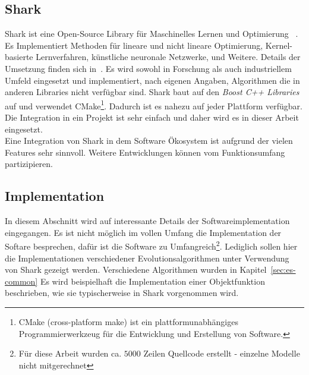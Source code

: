 %
\lstset{
	basicstyle=\scriptsize,
	language=C++,
	breaklines=true,
	frame=tbrl,
	breakatwhitespace=false
	breaklines=true,  
	xleftmargin=1cm,
	tabsize=2,
	showstringspaces=false}
%
\subsection{Shark}
\label{sec:Shark}
Shark ist eine Open-Source \cpp Library für Maschinelles Lernen und Optimierung ~\cite{Shark:1}. Es Implementiert Methoden für lineare und nicht lineare Optimierung, Kernel-basierte Lernverfahren, künstliche neuronale Netzwerke, und Weitere. Details der Umsetzung finden sich in~\cite{shark08}. Es wird sowohl in Forschung als auch industriellem Umfeld eingesetzt und implementiert, nach eigenen Angaben, Algorithmen die in anderen Libraries nicht verfügbar sind. Shark baut auf den \textit{Boost C++ Libraries} auf und verwendet CMake\footnote{CMake (cross-platform make) ist ein plattformunabhängiges Programmierwerkzeug für die Entwicklung und Erstellung von Software.}. Dadurch ist es nahezu auf jeder Plattform verfügbar. Die Integration in ein Projekt ist sehr einfach und daher wird es in dieser Arbeit eingesetzt.\\

Eine Integration von Shark in dem Software Ökosystem ist aufgrund der vielen Features sehr sinnvoll. Weitere Entwicklungen können vom Funktionsumfang partizipieren.

%
\subsection{Implementation}
\label{sec:Implementation}
In diesem Abschnitt wird auf interessante Details der Softwareimplementation eingegangen. Es ist nicht möglich im vollen Umfang die Implementation der Softare besprechen, dafür ist die Software zu Umfangreich\footnote{Für diese Arbeit wurden ca. $5000$ Zeilen Quellcode erstellt - einzelne Modelle nicht mitgerechnet}. Lediglich sollen hier die Implementationen verschiedener Evolutionsalgorithmen unter Verwendung von Shark gezeigt werden. Verschiedene Algorithmen wurden in Kapitel~\ref{sec:es-common} Es wird beispielhaft die Implementation einer Objektfunktion beschrieben, wie sie typischerweise in Shark vorgenommen wird.
%
%
%
